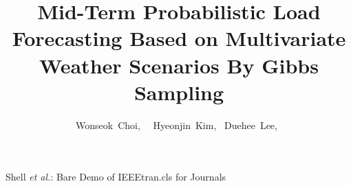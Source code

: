 \documentclass[journal]{IEEEtran} %
\begin{document}
\title{Mid-Term Probabilistic Load Forecasting Based on Multivariate Weather Scenarios By Gibbs Sampling}

\author{Wonseok~Choi,~ ~Hyeonjin~Kim,~
	Duehee~Lee,~
	}




%
{Shell \MakeLowercase{\textit{et al.}}: Bare Demo of IEEEtran.cls for Journals}
\maketitle














%  
\end{document}
